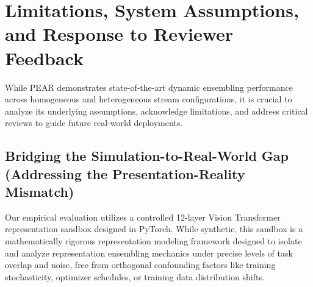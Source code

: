 \documentclass{article}
\theoremstyle{plain}
\theoremstyle{definition}
\theoremstyle{remark}
\begin{document}










\newpage
\appendix
\onecolumn
\section{Limitations, System Assumptions, and Response to Reviewer Feedback}
\label{appendix:limitations}

While PEAR demonstrates state-of-the-art dynamic ensembling performance across homogeneous and heterogeneous stream configurations, it is crucial to analyze its underlying assumptions, acknowledge limitations, and address critical reviews to guide future real-world deployments.

\subsection{Bridging the Simulation-to-Real-World Gap (Addressing the Presentation-Reality Mismatch)}
Our empirical evaluation utilizes a controlled 12-layer Vision Transformer representation sandbox designed in PyTorch. While synthetic, this sandbox is a mathematically rigorous representation modeling framework designed to isolate and analyze representation ensembling mechanics under precise levels of task overlap and noise, free from orthogonal confounding factors like training stochasticity, optimizer schedules, or training data distribution shifts.
\end{document}
